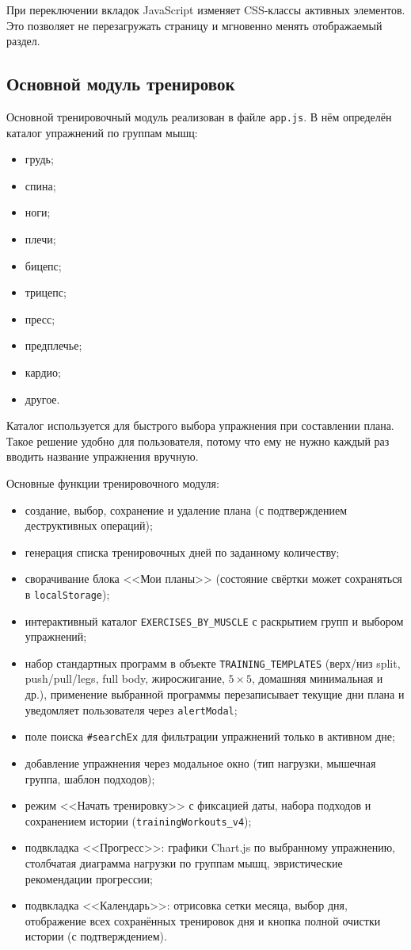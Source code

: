При переключении вкладок JavaScript изменяет CSS-классы активных элементов. Это позволяет не перезагружать страницу и мгновенно менять отображаемый раздел.

\subsection{Основной модуль тренировок}

Основной тренировочный модуль реализован в файле \texttt{app.js}. В нём определён каталог упражнений по группам мышц:
\begin{itemize}
	\item грудь;
	\item спина;
	\item ноги;
	\item плечи;
	\item бицепс;
	\item трицепс;
	\item пресс;
	\item предплечье;
	\item кардио;
	\item другое.
\end{itemize}

Каталог используется для быстрого выбора упражнения при составлении плана. Такое решение удобно для пользователя, потому что ему не нужно каждый раз вводить название упражнения вручную.

Основные функции тренировочного модуля:
\begin{itemize}
	\item создание, выбор, сохранение и удаление плана (с подтверждением деструктивных операций);
	\item генерация списка тренировочных дней по заданному количеству;
	\item сворачивание блока <<Мои планы>> (состояние свёртки может сохраняться в \texttt{localStorage});
	\item интерактивный каталог \texttt{EXERCISES\_BY\_MUSCLE} с раскрытием групп и выбором упражнений;
	\item набор стандартных программ в объекте \texttt{TRAINING\_TEMPLATES} (верх/низ split, push/pull/legs, full body, жиросжигание, $5\times5$, домашняя минимальная и др.), применение выбранной программы перезаписывает текущие дни плана и уведомляет пользователя через \texttt{alertModal};
	\item поле поиска \texttt{\#searchEx} для фильтрации упражнений только в активном дне;
	\item добавление упражнения через модальное окно (тип нагрузки, мышечная группа, шаблон подходов);
	\item режим <<Начать тренировку>> с фиксацией даты, набора подходов и сохранением истории (\texttt{trainingWorkouts\_v4});
	\item подвкладка <<Прогресс>>: графики Chart.js по выбранному упражнению, столбчатая диаграмма нагрузки по группам мышц, эвристические рекомендации прогрессии;
	\item подвкладка <<Календарь>>: отрисовка сетки месяца, выбор дня, отображение всех сохранённых тренировок дня и кнопка полной очистки истории (с подтверждением).
\end{itemize}

